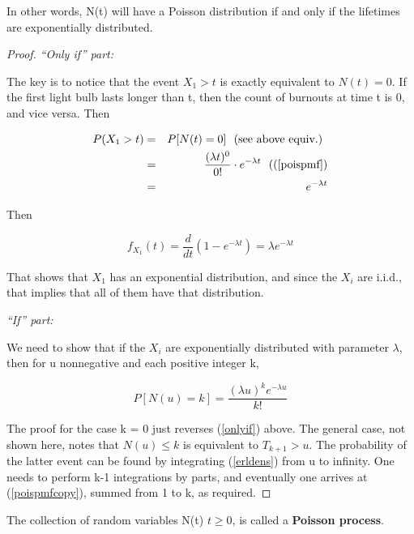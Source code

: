 In other words, N(t) will have a Poisson distribution if and only if the
lifetimes are exponentially distributed.  

\begin{proof}

{\it ``Only if'' part:}

The key is to notice that the event $X_1 > t$ is exactly equivalent to
$N(t) = 0$.  If the first light bulb lasts longer than t, then the
count of burnouts at time t is 0, and vice versa.  Then

\begin{eqnarray}
\label{onlyif}
P(X_1 > t) &=& P[N(t) = 0] ~~ \textrm{(see above equiv.) } \\
&=& \frac{(\lambda t)^0}{0!} \cdot e^{-\lambda t} ~~ ((\ref{poispmf})\\
&=& e^{-\lambda t} 
\end{eqnarray}

Then

\begin{equation} 
f_{X_1}(t) = \frac{d}{dt} (1 - e^{-\lambda t}) =
\lambda e^{-\lambda t} 
\end{equation}

That shows that $X_1$ has an exponential distribution, and since the
$X_i$ are i.i.d., that implies that all of them have that distribution.

{\it ``If'' part:}

We need to show that if the $X_i$ are exponentially distributed with
parameter $\lambda$, then for u nonnegative and each positive integer k,

\begin{equation}
\label{poispmfcopy}
P[N(u) = k] = \frac{(\lambda u)^k e^{-\lambda u}}{k!}
\end{equation}

The proof for the case k = 0 just reverses (\ref{onlyif}) above.  The
general case, not shown here, notes that $N(u) \leq k$ is equivalent to
$T_{k+1} > u$.  The probability of the latter event can be found by
integrating (\ref{erldens}) from u to infinity.  One needs to perform
k-1 integrations by parts, and eventually one arrives at
(\ref{poispmfcopy}), summed from 1 to k, as required.

\end{proof}
  
The collection of random variables N(t) $t \geq 0$, is called a {\bf
Poisson process}.


